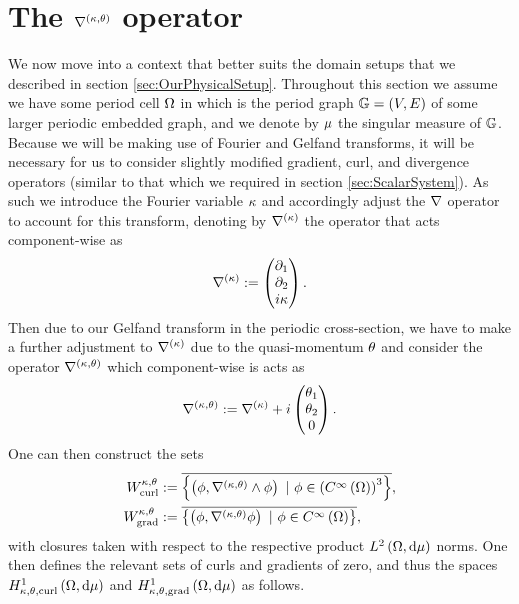 \section{The $\nabla^{\left( \kappa, \theta \right)}$ operator} \label{sec:ktOperator}
We now move into a context that better suits the domain setups that we described in section \ref{sec:OurPhysicalSetup}.
Throughout this section we assume we have some period cell $\Omega$ in which is the period graph $\mathbb{G}=\left( V,E \right)$ of some larger periodic embedded graph, and we denote by $\mu$ the singular measure of $\mathbb{G}$.
Because we will be making use of Fourier and Gelfand transforms, it will be necessary for us to consider slightly modified gradient, curl, and divergence operators (similar to that which we required in section \ref{sec:ScalarSystem}).
As such we introduce the Fourier variable $\kappa$ and accordingly adjust the $\nabla$ operator to account for this transform, denoting by $\nabla^{(\kappa)}$ the operator that acts component-wise as
\begin{align*}
	\nabla^{(\kappa)} := \begin{pmatrix} \partial_1 \\ \partial_2 \\ i\kappa\end{pmatrix}.
\end{align*}
Then due to our Gelfand transform in the periodic cross-section, we have to make a further adjustment to $\nabla^{(\kappa)}$ due to the quasi-momentum $\theta$ and consider the operator $\nabla^{\left( \kappa, \theta \right)}$ which component-wise is acts as
\begin{align*}
	\nabla^{\left( \kappa, \theta \right)} := \nabla^{(\kappa)} + i\begin{pmatrix} \theta_1 \\ \theta_2 \\ 0 \end{pmatrix}.
\end{align*}
One can then construct the sets
\begin{subequations} \label{eq:WktDefinitions}
	\begin{align}
		W^{\wavenumber, \qm}_{\mathrm{curl}} &:= \overline{ \clbracs{ \bracs{\phi, \ktcurl{}\phi} \ \vert \ \phi\in\bracs{\smooth{\ddom}}^3 } }, \\
		W^{\wavenumber, \qm}_{\mathrm{grad}} &:= \overline{ \clbracs{ \bracs{\phi, \ktgrad\phi} \ \vert \ \phi\in\smooth{\ddom} } },
	\end{align}
\end{subequations}
with closures taken with respect to the respective product $L^{2}\left( \Omega,\mathrm{d}\mu \right)$ norms.
One then defines the relevant sets of curls and gradients of zero, and thus the spaces $H^1_{\kappa,\theta,\mathrm{curl}}\left( \Omega, \mathrm{d}\mu \right)$ and $H^1_{\kappa,\theta,\mathrm{grad}}\left( \Omega, \mathrm{d}\mu \right)$ as follows.
